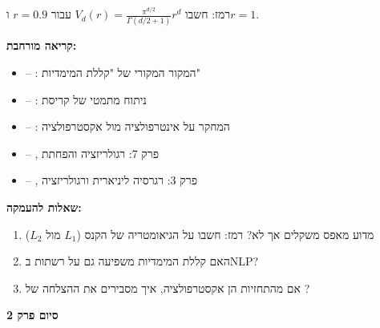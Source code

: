 רמז: חשבו $V_d(r) = \frac{\pi^{d/2}}{\Gamma(d/2 + \num{1})} r^d$ עבור $r = \num{0.9}$ ו\en{-}$r = \num{1}$.

\textbf{קריאה מורחבת:}

\begin{itemize}
\item \cite{bellman1957} – : המקור המקורי של "קללת המימדיות"
\item \cite{beyer1999} – : ניתוח מתמטי של קריסת 
\item \cite{chaman2021} – : המחקר על אינטרפולציה מול אקסטרפולציה
\item \cite{goodfellow2016} – , פרק \num{7}: רגולריזציה והפחתת 
\item \cite{hastie2009} – , פרק \num{3}: רגרסיה ליניארית ורגולריזציה
\end{itemize}

\textbf{שאלות להעמקה:}

\begin{enumerate}
\item מדוע  מאפס משקלים אך  לא? רמז: חשבו על הגיאומטריה של הקנס ($L_1$ מול $L_2$)
\item האם קללת המימדיות משפיעה גם על רשתות  ב\en{-}NLP?
\item אם  מהתחזיות הן אקסטרפולציה, איך מסבירים את ההצלחה של ?
\end{enumerate}

\textbf{סיום פרק \num{2}}